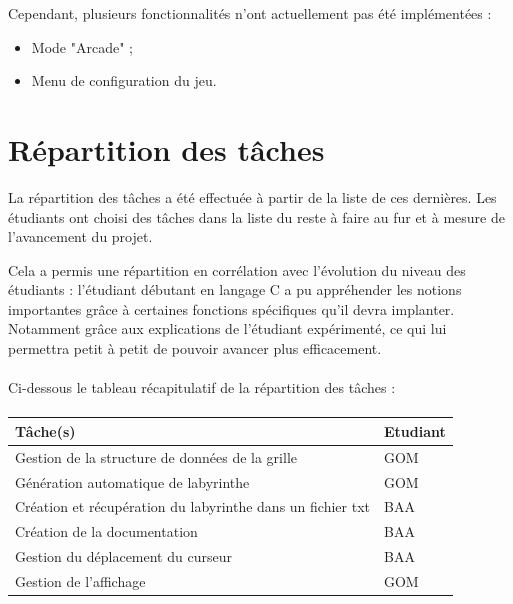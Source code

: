 \documentclass{book}
\begin{document}
Cependant, plusieurs fonctionnalités n'ont actuellement pas été implémentées :
\begin{itemize}
	\item Mode "Arcade" ;
	\item Menu de configuration du jeu.
\end{itemize}


\section{Répartition des tâches}

La répartition des tâches a été effectuée à partir de la liste de ces dernières.
Les étudiants ont choisi des tâches dans la liste du reste à faire au fur et à mesure de l'avancement du projet.

Cela a permis une répartition en corrélation avec l'évolution du niveau des étudiants :  
l’étudiant débutant en langage C a pu appréhender les notions importantes grâce à certaines fonctions spécifiques qu’il devra implanter. Notamment grâce aux explications de l’étudiant expérimenté, ce qui lui permettra petit à petit de pouvoir avancer plus efficacement.

\paragraph{}Ci-dessous le tableau récapitulatif de la répartition des tâches :

\paragraph{}
\begin{tabularx}{\linewidth}{|X|X|}
	\hline
	Tâche(s) & Etudiant \\
	\hline
	Gestion de la structure de données de la grille & GOM \\
	\hline
	Génération automatique de labyrinthe	& GOM	 \\
	\hline
	Création et récupération du labyrinthe dans un fichier txt & BAA \\
	\hline
	Création de la documentation & BAA \\
	\hline
	Gestion du déplacement du curseur &	BAA \\
	\hline
	Gestion de l'affichage & GOM \\
	\hline
\end{tabularx}
\end{document}
